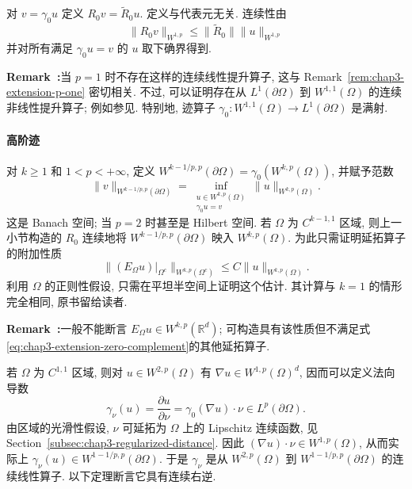 \begin{Proof}
对 $v=\gamma_0u$ 定义 $R_0v=\widetilde R_0u$. 定义与代表元无关. 连续性由
\[
 \|R_0v\|_{W^{1,p}}\leq\|\widetilde R_0\|\|u\|_{W^{1,p}}
\]
并对所有满足 $\gamma_0u=v$ 的 $u$ 取下确界得到.
\end{Proof}

\par\noindent{}\textbf{Remark~\thechapterthreesectiontworemark:}\label{rem:chap3-lifting-p-one}\quad 当 $p=1$ 时不存在这样的连续线性提升算子, 这与 Remark~\ref{rem:chap3-extension-p-one} 密切相关. 不过, 可以证明存在从 $L^1(\partial\Omega)$ 到 $W^{1,1}(\Omega)$ 的连续非线性提升算子; 例如参见. 特别地, 迹算子 $\gamma_0:W^{1,1}(\Omega)\to L^1(\partial\Omega)$ 是满射.

\paragraph{高阶迹}

对 $k\geq1$ 和 $1<p<+\infty$, 定义 $W^{k-1/p,p}(\partial\Omega)=\gamma_0(W^{k,p}(\Omega))$, 并赋予范数
\[
 \|v\|_{W^{k-1/p,p}(\partial\Omega)}
 =\inf_{\substack{u\in W^{k,p}(\Omega)\\\gamma_0u=v}}
 \|u\|_{W^{k,p}(\Omega)}.
\]
这是 Banach 空间; 当 $p=2$ 时甚至是 Hilbert 空间. 若 $\Omega$ 为 $C^{k-1,1}$ 区域, 则上一小节构造的 $R_0$ 连续地将 $W^{k-1/p,p}(\partial\Omega)$ 映入 $W^{k,p}(\Omega)$. 为此只需证明延拓算子的附加性质
\begin{equation}
 \|(E_\Omega u)|_{\Omega^c}\|_{W^{k,p}(\Omega^c)}
 \leq C\|u\|_{W^{k,p}(\Omega)}.
 \label{eq:chap3-higher-order-extension-bound}
\end{equation}
利用 $\Omega$ 的正则性假设, 只需在平坦半空间上证明这个估计. 其计算与 $k=1$ 的情形完全相同, 原书留给读者.

\par\noindent{}\textbf{Remark~\thechapterthreesectiontworemark:}\label{rem:chap3-higher-extension-caveat}\quad 一般不能断言 $E_\Omega u\in W^{k,p}(\mathbb R^d)$; 可构造具有该性质但不满足式\eqref{eq:chap3-extension-zero-complement}的其他延拓算子.

若 $\Omega$ 为 $C^{1,1}$ 区域, 则对 $u\in W^{2,p}(\Omega)$ 有 $\nabla u\in W^{1,p}(\Omega)^d$, 因而可以定义法向导数
\[
 \gamma_\nu(u)=\frac{\partial u}{\partial\nu}=\gamma_0(\nabla u)\cdot\nu\in L^p(\partial\Omega).
\]
由区域的光滑性假设, $\nu$ 可延拓为 $\Omega$ 上的 Lipschitz 连续函数, 见 Section~\ref{subsec:chap3-regularized-distance}. 因此 $(\nabla u)\cdot\nu\in W^{1,p}(\Omega)$, 从而实际上 $\gamma_\nu(u)\in W^{1-1/p,p}(\partial\Omega)$. 于是 $\gamma_\nu$ 是从 $W^{2,p}(\Omega)$ 到 $W^{1-1/p,p}(\partial\Omega)$ 的连续线性算子. 以下定理断言它具有连续右逆.

